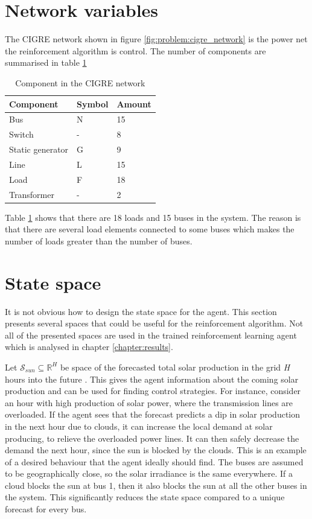 \documentclass[class=book, crop=false]{standalone}
\begin{document}
\section{Network variables}
The CIGRE network shown in figure \ref{fig:problem:cigre_network} is the power net the reinforcement algorithm is control. The number of components are summarised in table \ref{table:cigre_components}

\begin{table}[ht]
\centering
\caption{Component in the CIGRE network}
\label{table:cigre_components}
\begin{tabular}{l|ll}

Component  & Symbol & Amount 
\\ 
\hline
Bus & N & 15 \\
Switch & - & 8 \\
Static generator & G & 9 \\ 
Line & L & 15 \\
Load & F & 18 \\
Transformer &- & 2

 \\
\hline
\end{tabular}
\end{table}
Table \ref{table:cigre_components} shows that there are 18 loads and 15 buses in the system. The reason is that there are several load elements connected to some buses which makes the number of loads greater than the number of buses.  



\section{State space}\label{section:problem:state_space}
It is not obvious how to design the state space for the agent. This section presents several spaces that could be useful for the reinforcement algorithm. Not all of the presented spaces are used in the trained reinforcement learning agent which is analysed in chapter \ref{chapter:results}.

Let $\mathcal{S}_{sun} \subseteq  \mathbb{R}^{H}$ be space of the forecasted total solar production in the grid \textit{H} hours into the future . This gives the agent information about the coming solar production and can be used for finding control strategies. For instance, consider an hour with high production of solar power, where the transmission lines are overloaded. If the agent sees that the forecast predicts a dip in solar production in the next hour due to clouds, it can increase the local demand at solar producing, to relieve the overloaded power lines. It can then safely decrease the demand the next hour, since the sun is blocked by the clouds. This is an example of a desired behaviour that the agent ideally should find. The buses are assumed to be geographically close, so the solar irradiance is the same everywhere. If a cloud blocks the sun at bus 1, then it also blocks the sun at all the other buses in the system. This significantly reduces the state space compared to a unique forecast for every bus. 
\end{document}
